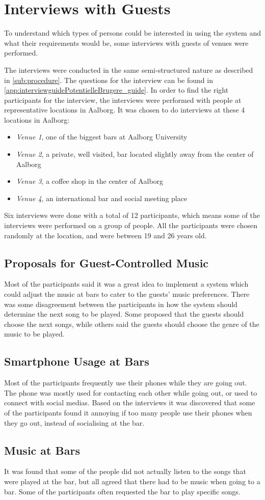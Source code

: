 \section{Interviews with Guests}
\label{userInterviews}

To understand which types of persons could be interested in using the system and what their requirements would be, some interviews with guests of venues were performed.

The interviews were conducted in the same semi-structured nature as described in \cref{sub:procedure}. The questions for the interview can be found in \cref{app:interviewguidePotentielleBrugere_guide}. In order to find the right participants for the interview, the interviews were performed with people at representative locations in Aalborg. It was chosen to do interviews at these 4 locations in Aalborg:

\begin{itemize}
    \item \emph{Venue 1}, one of the biggest bars at Aalborg University
    \item \emph{Venue 2}, a private, well visited, bar located slightly away from the center of Aalborg
    \item \emph{Venue 3}, a coffee shop in the center of Aalborg
    \item \emph{Venue 4}, an international bar and social meeting place
\end{itemize}

Six interviews were done with a total of 12 participants, which means
some of the interviews were performed on a group of people. All the
participants were chosen randomly at the location, and were between 19 and 26 years old.

\subsection{Proposals for Guest-Controlled Music}
Most of the participants said it was a great idea to implement a system which could adjust the music at bars to cater to the guests' music preferences. There was some disagreement between the participants in how the system should determine the next song to be played. Some proposed that the guests should choose the next songs, while others said the guests should choose the genre of the music to be played.

\subsection{Smartphone Usage at Bars}
Most of the participants frequently use their phones while they are going out. The phone was mostly used for contacting each other while going out, or used to connect with social medias.
Based on the interviews it was discovered that some of the participants found it annoying if too many people use their phones when they go out, instead of socialising at the bar.

\subsection{Music at Bars}
It was found that some of the people did not actually listen to the songs that were played at the bar, but all agreed that there had to be music when going to a bar. Some of the participants often requested the bar to play specific songs.
